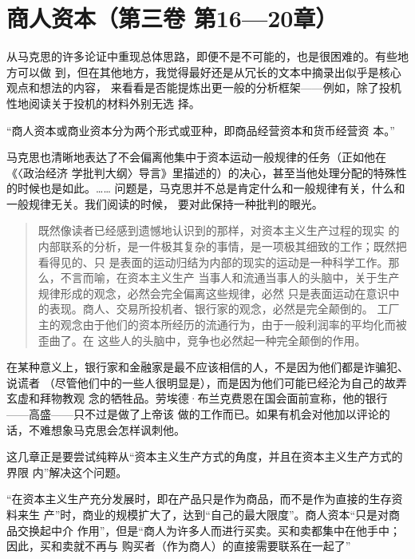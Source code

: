 \chapter{商人资本（第三卷 第16—20章）}

从马克思的许多论证中重现总体思路，即便不是不可能的，也是很困难的。有些地方可以做
到，但在其他地方，我觉得最好还是从冗长的文本中摘录出似乎是核心观点和想法的内容，
来看看是否能提炼出更一般的分析框架——例如，除了投机性地阅读关于投机的材料外别无选
择。

“商人资本或商业资本分为两个形式或亚种，即商品经营资本和货币经营资
本。”

马克思也清晰地表达了不会偏离他集中于资本运动一般规律的任务（正如他在《〈政治经济
学批判大纲〉导言》里描述的）的决心，甚至当他处理分配的特殊性的时候也是如此。……
问题是，马克思并不总是肯定什么和一般规律有关，什么和一般规律无关。我们阅读的时候，
要对此保持一种批判的眼光。

\begin{quotation}既然像读者已经感到遗憾地认识到的那样，对资本主义生产过程的现实
的内部联系的分析，是一件极其复杂的事情，是一项极其细致的工作；既然把看得见的、只
是表面的运动归结为内部的现实的运动是一种科学工作。那么，不言而喻，在资本主义生产
当事人和流通当事人的头脑中，关于生产规律形成的观念，必然会完全偏离这些规律，必然
只是表面运动在意识中的表现。商人、交易所投机者、银行家的观念，必然是完全颠倒的。
工厂主的观念由于他们的资本所经历的流通行为，由于一般利润率的平均化而被歪曲了。在
这些人的头脑中，竞争也必然起一种完全颠倒的作用。
\end{quotation}

在某种意义上，银行家和金融家是最不应该相信的人，不是因为他们都是诈骗犯、说谎者
（尽管他们中的一些人很明显是），而是因为他们可能已经沦为自己的故弄玄虚和拜物教观
念的牺牲品。劳埃德·布兰克费恩在国会面前宣称，他的银行——高盛——只不过是做了上帝该
做的工作而已。如果有机会对他加以评论的话，不难想象马克思会怎样讽刺他。

这几章正是要尝试纯粹从“资本主义生产方式的角度，并且在资本主义生产方式的界限
内”解决这个问题。

“在资本主义生产充分发展时，即在产品只是作为商品，而不是作为直接的生存资料来生
产”时，商业的规模扩大了，达到“自己的最大限度”。商人资本“只是对商品交换起中介
作用”，但是“商人为许多人而进行买卖。买和卖都集中在他手中；因此，买和卖就不再与
购买者（作为商人）的直接需要联系在一起了”

